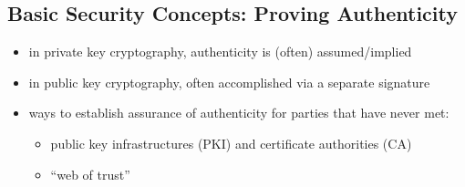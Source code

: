 \documentclass[xga]{xdvislides}
\begin{document}
\subsection{Basic Security Concepts: Proving Authenticity}
\begin{itemize}
	\item in private key cryptography, authenticity is (often) assumed/implied
	\item in public key cryptography, often accomplished via a separate
		signature
	\item ways to establish assurance of authenticity for parties that have
		never met:
		\begin{itemize}
			\item public key infrastructures (PKI) and certificate
				authorities (CA)
			\item ``web of trust''
		\end{itemize}
\end{itemize}
\end{document}
